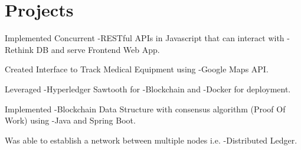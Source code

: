 \documentclass[]{hieudo-build}
\begin{document}
\begin{minipage}[t]{0.65\textwidth}


\section{Projects}

\href{https://github.com/Sid330s/Chain4India-Supply-Chain-Model-for-PPE-Kits}{}
\begin{tightemize}
\item Implemented Concurrent {\makebl -RESTful APIs} in Javascript that can interact with {\makebl -Rethink DB} and serve Frontend Web App.
\item Created Interface to Track Medical Equipment using {\makebl -Google Maps API}.
\item Leveraged {\makebl -Hyperledger Sawtooth} for {\makebl -Blockchain} and {\makebl -Docker} for deployment.
\end{tightemize}
\sectionsep

\href{https://github.com/Sid330s/Blockchain-Implementation}{}

\begin{tightemize}
\item Implemented {\makebl -Blockchain Data Structure} with consensus algorithm (Proof Of Work) using {\makebl -Java and Spring Boot}.
\item Was able to establish a network between multiple nodes i.e. {\makebl -Distributed Ledger}.
\end{tightemize}
\sectionsep



\end{minipage}
\end{document}
